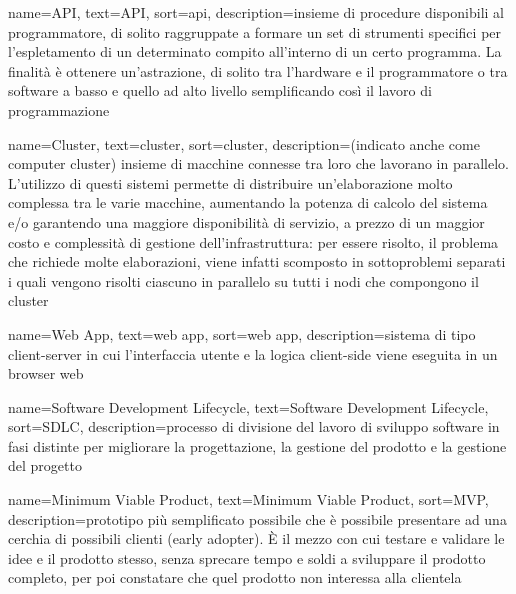 
\renewcommand{\acronymname}{Acronimi e abbreviazioni}

{
    name=API,
    text=API,
    sort=api,
    description={insieme di procedure disponibili al programmatore, di solito raggruppate a formare un set di strumenti specifici per l'espletamento di un determinato compito all'interno di un certo programma. La finalità è ottenere un'astrazione, di solito tra l'hardware e il programmatore o tra software a basso e quello ad alto livello semplificando così il lavoro di programmazione}
}

{
    name=Cluster,
    text=cluster,
    sort=cluster,
    description={(indicato anche come computer cluster) insieme di macchine connesse tra loro che lavorano in parallelo.
    L'utilizzo di questi sistemi permette di distribuire un'elaborazione molto complessa tra le varie macchine, aumentando la potenza di calcolo del sistema e/o garantendo una maggiore disponibilità di servizio, a prezzo di un maggior costo e complessità di gestione dell'infrastruttura: per essere risolto, il problema che richiede molte elaborazioni, viene infatti scomposto in sottoproblemi separati i quali vengono risolti ciascuno in parallelo su tutti i nodi che compongono il cluster}
}

{
	name=Web App,
	text=web app,
	sort=web app,
	description={sistema di tipo client-server in cui l'interfaccia utente e la logica client-side viene eseguita in un browser web}
}

{
	name=Software Development Lifecycle,
	text=Software Development Lifecycle,
	sort=SDLC,
	description={processo di divisione del lavoro di sviluppo software in fasi distinte per migliorare la progettazione, la gestione del prodotto e la gestione del progetto}
}

{
	name=Minimum Viable Product,
	text=Minimum Viable Product,
	sort=MVP,
	description={prototipo più semplificato possibile che è possibile presentare ad una cerchia di possibili clienti (early adopter). È il mezzo con cui testare e validare le idee e il prodotto stesso, senza sprecare tempo e soldi a sviluppare il prodotto completo, per poi constatare che quel prodotto non interessa alla clientela}
}

